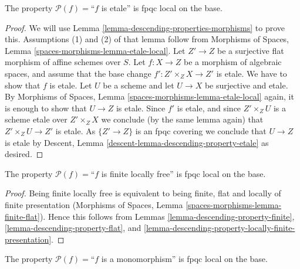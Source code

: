 \begin{lemma}
\label{lemma-descending-property-etale}
The property $\mathcal{P}(f) =$``$f$ is etale''
is fpqc local on the base.
\end{lemma}

\begin{proof}
We will use
Lemma \ref{lemma-descending-properties-morphisms}
to prove this. Assumptions (1) and (2) of that lemma follow from
Morphisms of Spaces,
Lemma \ref{spaces-morphisms-lemma-etale-local}.
Let $Z' \to Z$ be a surjective flat morphism of affine schemes over $S$.
Let $f : X \to Z$ be a morphism of algebraic spaces, and assume
that the base change $f' : Z' \times_Z X \to Z'$ is etale.
We have to show that $f$ is etale. Let $U$ be a scheme
and let $U \to X$ be surjective and etale. By
Morphisms of Spaces,
Lemma \ref{spaces-morphisms-lemma-etale-local}
again, it is enough to show that $U \to Z$ is etale.
Since $f'$ is etale, and since $Z' \times_Z U$ is a
scheme etale over $Z' \times_Z X$ we conclude (by the same lemma again) that
$Z' \times_Z U \to Z'$ is etale.
As $\{Z' \to Z\}$ is an fpqc covering we conclude that
$U \to Z$ is etale by
Descent, Lemma \ref{descent-lemma-descending-property-etale}
as desired.
\end{proof}

\begin{lemma}
\label{lemma-descending-property-finite-locally-free}
The property $\mathcal{P}(f) =$``$f$ is finite locally free''
is fpqc local on the base.
\end{lemma}

\begin{proof}
Being finite locally free is equivalent to being
finite, flat and locally of finite presentation
(Morphisms of Spaces, Lemma \ref{spaces-morphisms-lemma-finite-flat}).
Hence this follows from Lemmas
\ref{lemma-descending-property-finite},
\ref{lemma-descending-property-flat}, and
\ref{lemma-descending-property-locally-finite-presentation}.
\end{proof}

\begin{lemma}
\label{lemma-descending-property-monomorphism}
The property $\mathcal{P}(f) =$``$f$ is a monomorphism''
is fpqc local on the base.
\end{lemma}

